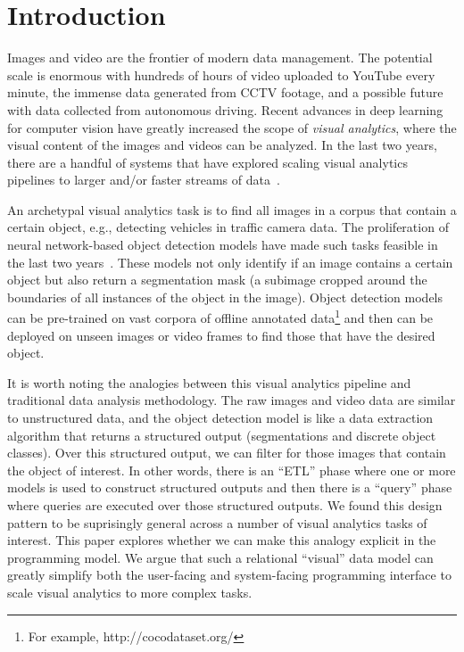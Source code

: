 \section{Introduction}\label{intro}\sloppy
Images and video are the frontier of modern data management.
The potential scale is enormous with hundreds of hours of video uploaded to YouTube every minute, the immense data generated from CCTV footage, and a possible future with data collected from autonomous driving. 
Recent advances in deep learning for computer vision have greatly increased the scope of \emph{visual analytics}, where the visual content of the images and videos can be analyzed.
In the last two years, there are a handful of systems that have explored scaling visual analytics pipelines to larger and/or faster streams of data~\cite{anderson2018predicate, kang2018blazeit,kang2017noscope, wu2018querying, sparks2017keystoneml}.

An archetypal visual analytics task is to find all images in a corpus that contain a certain object, e.g., detecting vehicles in traffic camera data.
The proliferation of neural network-based object detection models have made such tasks feasible in the last two years~\cite{he2017mask}.
These models not only identify if an image contains a certain object but also return a segmentation mask (a subimage cropped around the boundaries of all instances of the object in the image).
Object detection models can be pre-trained on vast corpora of offline annotated data\footnote{For example, http://cocodataset.org/} and then can be deployed on unseen images or video frames to find those that have the desired object.

It is worth noting the analogies between this visual analytics pipeline and traditional data analysis methodology.
The raw images and video data are similar to unstructured data, and the object detection model is like a data extraction algorithm that returns a structured output (segmentations and discrete object classes).
Over this structured output, we can filter for those images that contain the object of interest.
In other words, there is an ``ETL'' phase where one or more models is used to construct structured outputs and then there is a ``query'' phase where queries are executed over those structured outputs.
We found this design pattern to be suprisingly general across a number of visual analytics tasks of interest.
This paper explores whether we can make this analogy explicit in the programming model.
We argue that such a relational ``visual'' data model can greatly simplify both the user-facing and system-facing programming interface to scale visual analytics to more complex tasks.

